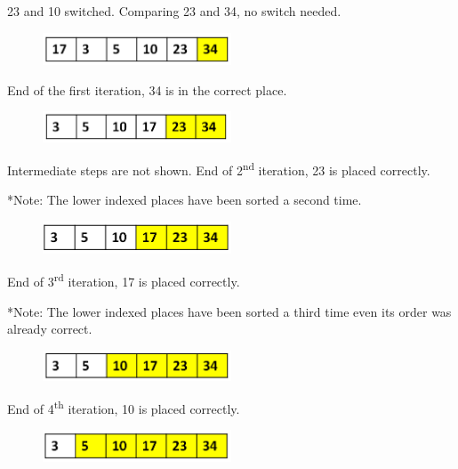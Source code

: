 23 and 10 switched. Comparing 23 and 34, no switch needed. 

\begin{figure}[H]
\centering
\includegraphics[width=0.5\textwidth]{pictures/bubble7.png}
\label{fig:bubble7}
\end{figure}

End of the first iteration, 34 is in the correct place.

\begin{figure}[H]
\centering
\includegraphics[width=0.5\textwidth]{pictures/bubble8.png}
\label{fig:bubble8}
\end{figure}

Intermediate steps are not shown.  End of 2\textsuperscript{nd} iteration, 23 is placed correctly.

*Note: The lower indexed places have been sorted a second time.

\begin{figure}[H]
\centering
\includegraphics[width=0.5\textwidth]{pictures/bubble9.png}
\label{fig:bubble9}
\end{figure}

End of 3\textsuperscript{rd} iteration, 17 is placed correctly.

*Note: The lower indexed places have been sorted a third time even its order was already correct.

\begin{figure}[H]
\centering
\includegraphics[width=0.5\textwidth]{pictures/bubble10.png}
\label{fig:bubble10}
\end{figure}

End of 4\textsuperscript{th} iteration, 10 is placed correctly.

\begin{figure}[H]
\centering
\includegraphics[width=0.5\textwidth]{pictures/bubble11.png}
\label{fig:bubble11}
\end{figure}

